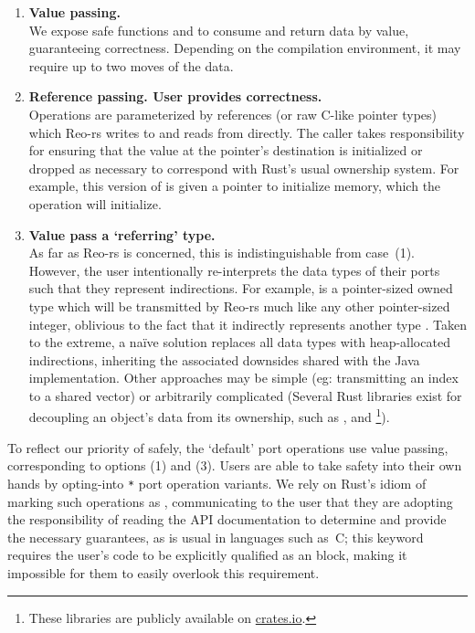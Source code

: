 \begin{enumerate}
	\item \textbf{Value passing.}\\
	We expose safe functions  and  to consume and return data by value, guaranteeing correctness. Depending on the compilation environment, it may require up to two moves of the data.
	
	\item \textbf{Reference passing. User provides correctness.}\\
	Operations are parameterized by references (or raw C-like pointer types) which Reo-rs writes to and reads from directly. The caller takes responsibility for ensuring that the value at the pointer's destination is initialized or dropped as necessary to correspond with Rust's usual ownership system. For example, this version of  is given a pointer to initialize memory, which the operation will initialize.
	
	\item \textbf{Value pass a `referring' type.}\\
	As far as Reo-rs is concerned, this is indistinguishable from case~(1). However, the user intentionally re-interprets the data types of their ports such that they represent indirections. For example,  is a pointer-sized owned type which will be transmitted by Reo-rs much like any other pointer-sized integer, oblivious to the fact that it indirectly represents another type . Taken to the extreme, a na\"ive solution replaces all data types with heap-allocated indirections, inheriting the associated downsides shared with the Java implementation. Other approaches may be simple (eg: transmitting an index to a shared vector) or arbitrarily complicated (Several Rust libraries exist for decoupling an object's data from its ownership, such as ,  and \footnote{These libraries are publicly available on \url{crates.io}.}). 
\end{enumerate}

To reflect our priority of safely, the `default' port operations use value passing, corresponding to options (1) and (3). Users are able to take safety into their own hands by opting-into \texttt{*} port operation variants. We rely on Rust's idiom of marking such operations as , communicating to the user that they are adopting the responsibility of reading the API documentation to determine and provide the necessary guarantees, as is usual in languages such as~C; this keyword requires the user's code to be explicitly qualified as an  block, making it impossible for them to easily overlook this requirement. 

